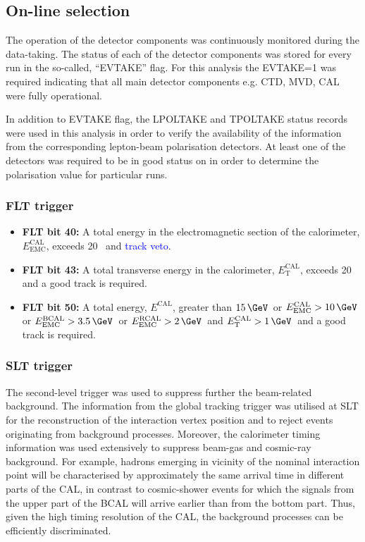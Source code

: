 \subsection{On-line selection}
\label{subsec:onlineselect}
The operation of the detector components was continuously monitored during the data-taking. The status of each of the detector components was stored for every run in the so-called, ``EVTAKE'' flag. For this analysis the EVTAKE=1 was required indicating that all main detector components e.g. CTD, MVD, CAL were fully operational.

In addition to EVTAKE flag, the LPOLTAKE and TPOLTAKE status records were used in this analysis in order to verify the availability of the information from the corresponding lepton-beam polarisation detectors. At least one of the detectors was required to be in good status on in order to determine the polarisation value for particular runs.
\subsubsection{FLT trigger}
\label{subsubsec:fltcuts}
\begin{itemize}
	\item \textbf{FLT bit 40:} A total energy in the electromagnetic section of the calorimeter, $E_\text{EMC}^\text{CAL}$, exceeds 20 \GeV\, and \textcolor{blue}{track veto}.
	\item \textbf{FLT bit 43:} A total transverse energy in the calorimeter, $E_\text{T}^\text{CAL}$, exceeds 20 \GeV\, and a good track is required.
	\item \textbf{FLT bit 50:} A total energy, $E^\text{CAL}$, greater than $15\, \GeV$\, or $E_\text{EMC}^\text{CAL} > 10\, \GeV\,$ or $E_\text{EMC}^\text{BCAL} > 3.5\, \GeV$\, or $E_\text{EMC}^\text{RCAL} > 2\, \GeV$\, and $E_\text{T}^\text{CAL} > 1\, \GeV$\, and a good track is required.
\end{itemize}

\subsubsection{SLT trigger}
\label{subsubsec:sltcuts}
The second-level trigger was used to suppress further the beam-related background. The information from the \zeus global tracking trigger was utilised at SLT for the reconstruction of the interaction vertex position and to reject events originating from background processes. Moreover, the calorimeter timing information was used extensively to suppress beam-gas and cosmic-ray background. For example, hadrons emerging in vicinity of the nominal interaction point will be characterised by approximately the same arrival time in different parts of the CAL, in contrast to cosmic-shower events for which the signals from the upper part of the BCAL will arrive earlier than from the bottom part. Thus, given the high timing resolution of the CAL, the background processes can be efficiently discriminated.

